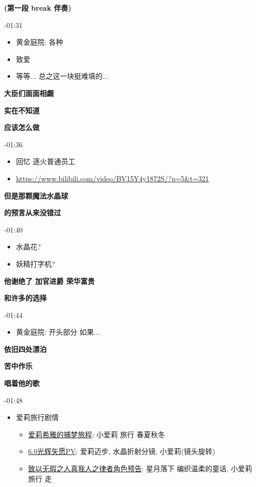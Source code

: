 \documentclass[a4paper]{article}
\begin{document}
\textbf{(第一段 break 伴奏)}

-01:31

\begin{itemize}
    \item 黄金庭院: 各种
    \item 致爱
    \item 等等... 总之这一块挺难填的...
\end{itemize}

\textbf{大臣们面面相觑}

\textbf{实在不知道}

\textbf{应该怎么做}

-01:36

\begin{itemize}
    \item 回忆 逐火普通员工
    \item \url{https://www.bilibili.com/video/BV15Y4y1872S/?p=5&t=321}
\end{itemize}

\textbf{但是那颗魔法水晶球}

\textbf{的预言从来没错过}

-01:40

\begin{itemize}
    \item 水晶花?
    \item 妖精打字机?
\end{itemize}

\textbf{他谢绝了 加官进爵 荣华富贵}

\textbf{和许多的选择}

-01:44

\begin{itemize}
    \item 黄金庭院: 开头部分 如果...
\end{itemize}

\textbf{依旧四处漂泊}

\textbf{苦中作乐}

\textbf{唱着他的歌}

-01:48

\begin{itemize}
    \item 爱莉旅行剧情
    \begin{itemize}
        \item \href{https://www.bilibili.com/video/BV1ZW4y1t7Zf/}{爱莉希雅的捕梦旅程}: 小爱莉 旅行 春夏秋冬
        \item \href{https://www.bilibili.com/video/BV1Mg411k7U5/}{6.0光辉矢愿PV}: 爱莉迈步, 水晶折射分镜, 小爱莉(镜头旋转)
        \item \href{https://www.bilibili.com/video/BV1DS4y1t7rs/}{致以无瑕之人真我人之律者角色预告}: 星月落下 编织温柔的童话, 小爱莉 旅行 走
    \end{itemize}
\end{itemize}
\end{document}
